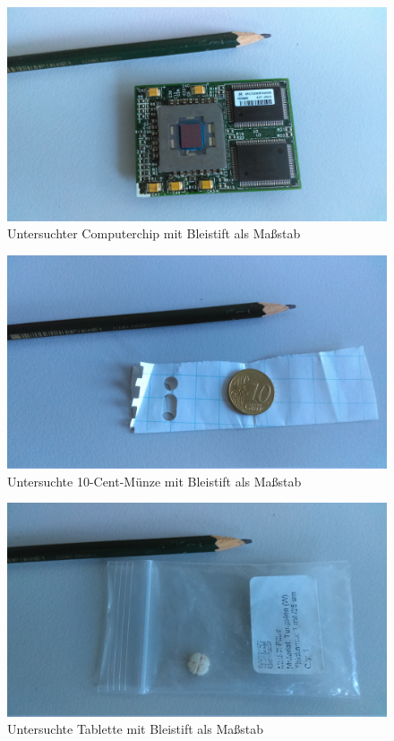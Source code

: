 \documentclass[a4paper,14pt]{article}
\begin{document}
\begin{figure}[H]
\centering
\includegraphics[width=\textwidth]{../Photos/Chip.jpg}
\caption{Untersuchter Computerchip mit Bleistift als Maßstab}
\label{Stein}
\end{figure}

\begin{figure}[H]
\centering
\includegraphics[width=\textwidth]{../Photos/10ct.jpg}
\caption{Untersuchte 10-Cent-Münze mit Bleistift als Maßstab}
\label{10ct}
\end{figure}

\begin{figure}[H]
\centering
\includegraphics[width=\textwidth]{../Photos/Pille.jpg}
\caption{Untersuchte Tablette mit Bleistift als Maßstab}
\label{Pille}
\end{figure}
\end{document}
